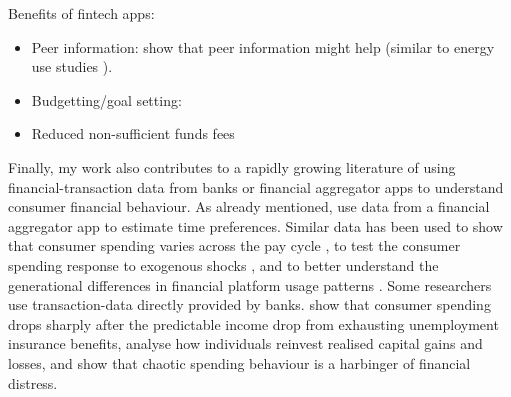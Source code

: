 Benefits of fintech apps:
\begin{itemize}

    \item Peer information: \citet{dacunto2020crowdsourcing} show that peer
        information might help (similar to energy use studies
        \citet{allcott2014short}).

    \item Budgetting/goal setting: \citet{gargano2021goal, lukas2022influence}

    \item Reduced non-sufficient funds fees \citet{carlin2022mobile}

\end{itemize}

Finally, my work also contributes to a rapidly growing literature of using
financial-transaction data from banks or financial aggregator apps to understand
consumer financial behaviour. As already mentioned, \citet{kuchler2020sticking}
use data from a financial aggregator app to estimate time preferences. Similar
data has been used to show that consumer spending varies across the pay cycle
\citep{gelman2014harnessing,olafsson2018liquid}, to test the consumer spending
response to exogenous shocks \citep{baker2018debt,baugh2014disentangling}, and
to better understand the generational differences in financial platform usage
patterns \citep{carlin2019generational}. Some researchers use transaction-data
directly provided by banks. \citet{ganong2019consumer} show that consumer
spending drops sharply after the predictable income drop from exhausting
unemployment insurance benefits, \citet{meyer2018fully} analyse how individuals
reinvest realised capital gains and losses, and
\citet{muggleton2020evidence} show that chaotic spending behaviour is a
harbinger of financial distress.

